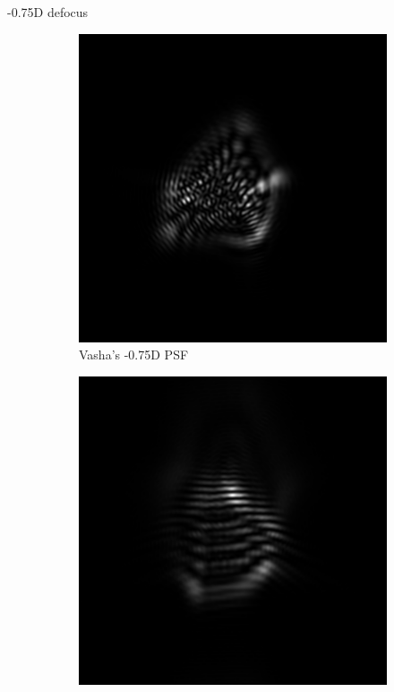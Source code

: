 \documentclass{article}
\begin{document}
-0.75D defocus
\begin{figure}[H]

\begin{subfigure}{.3\textwidth}
  \centering
  \includegraphics[width=1\linewidth]{Vasha_R_G_0530_2_500_zer_-075_5_PSF.png}
  \caption{Vasha's -0.75D PSF}
  \label{fig:vashan075dpsf}
\end{subfigure}
\begin{subfigure}{.3\textwidth}
  \centering
  \includegraphics[width=1\linewidth]{Liz_R_G_0523_2_500_zer_-075_5_PSF.png}

\end{subfigure}
\end{figure}
\end{document}
